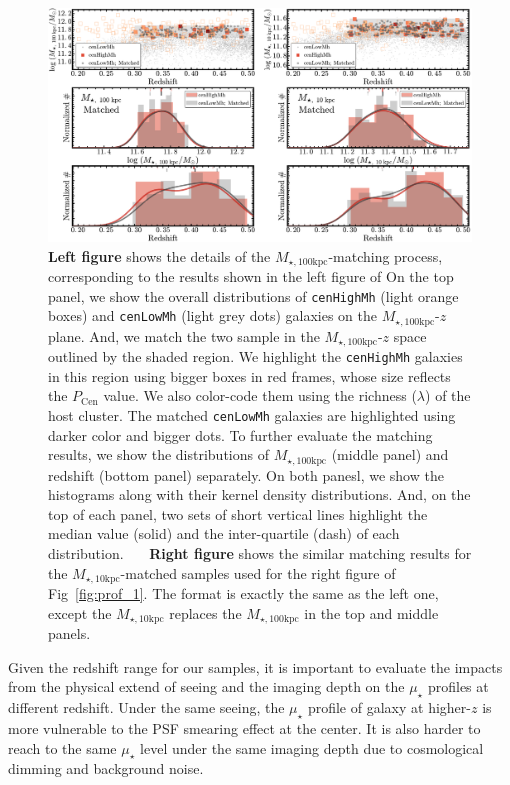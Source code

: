 \documentclass[a4paper,fleqn,usenatbib]{mnras}
\def\rbcg{\texttt{cenHighMh}}
\def\nbcg{\texttt{cenLowMh}}
\def\minn{{$M_{\star,10\mathrm{kpc}}$}}
\def\mtot{{$M_{\star,100\mathrm{kpc}}$}}
\def\mden{{$\mu_{\star}$}}
\begin{document}
\begin{figure}
    \centering 
    \includegraphics[width=15.0cm]{fig/redbcg_match}
    \caption{
        \textbf{Left figure} shows the details of the \mtot{}-matching process, 
        corresponding to the results shown in the left figure of   
        On the top panel, we show the overall distributions of \rbcg{} (light orange boxes) 
        and \nbcg{} (light grey dots) galaxies on the \mtot{}-$z$ plane.  
        And, we match the two sample in the \mtot{}-$z$ space outlined by the shaded region.
        We highlight the \rbcg{} galaxies in this region using bigger boxes in red frames, 
        whose size reflects the $P_{\mathrm{Cen}}$ value.  
        We also color-code them using the richness ($\lambda$) of the host cluster. 
        The matched \nbcg{} galaxies are highlighted using darker color and bigger dots. 
        To further evaluate the matching results, we show the distributions of \mtot{} 
        (middle panel) and redshift (bottom panel) separately. 
        On both panesl, we show the histograms along with their kernel density 
        distributions.  
        And, on the top of each panel, two sets of short vertical lines highlight the median 
        value (solid) and the inter-quartile (dash) of each distribution.~~~
        \textbf{Right figure} shows the similar matching results for the \minn{}-matched
        samples used for the right figure of Fig~\ref{fig:prof_1}.
        The format is exactly the same as the left one, except the \minn{} replaces the 
        \mtot{} in the top and middle panels.}
    \label{fig:match}
\end{figure}

    Given the redshift range for our samples, it is important to evaluate 
    the impacts from the physical extend of seeing and the imaging depth on the \mden{} 
    profiles at different redshift. 
    Under the same seeing, the \mden{} profile of galaxy at higher-$z$ is more 
    vulnerable to the PSF smearing effect at the center. 
    It is also harder to reach to the same \mden{} level under the same imaging depth 
    due to cosmological dimming and background noise. 
    
\end{document}
